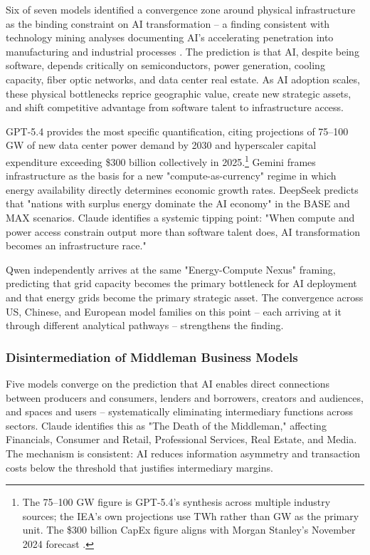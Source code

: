 \documentclass[preprint,review,12pt]{elsarticle}
\begin{document}
Six of seven models identified a convergence zone around physical infrastructure as the binding constraint on AI transformation -- a finding consistent with technology mining analyses documenting AI's accelerating penetration into manufacturing and industrial processes \citep{zeba2021aimanufacturing}. The prediction is that AI, despite being software, depends critically on semiconductors, power generation, cooling capacity, fiber optic networks, and data center real estate. As AI adoption scales, these physical bottlenecks reprice geographic value, create new strategic assets, and shift competitive advantage from software talent to infrastructure access.

GPT-5.4 provides the most specific quantification, citing projections of 75--100 GW of new data center power demand by 2030 and hyperscaler capital expenditure exceeding \$300 billion collectively in 2025.\footnote{The 75--100 GW figure is GPT-5.4's synthesis across multiple industry sources; the IEA's own projections use TWh rather than GW as the primary unit. The \$300 billion CapEx figure aligns with Morgan Stanley's November 2024 forecast \citep{morganstanley2024capex}.} Gemini frames infrastructure as the basis for a new "compute-as-currency" regime in which energy availability directly determines economic growth rates. DeepSeek predicts that "nations with surplus energy dominate the AI economy" in the BASE and MAX scenarios. Claude identifies a systemic tipping point: "When compute and power access constrain output more than software talent does, AI transformation becomes an infrastructure race."

Qwen independently arrives at the same "Energy-Compute Nexus" framing, predicting that grid capacity becomes the primary bottleneck for AI deployment and that energy grids become the primary strategic asset. The convergence across US, Chinese, and European model families on this point -- each arriving at it through different analytical pathways -- strengthens the finding.


\subsubsection{Disintermediation of Middleman Business Models}
\label{sec:disintermediation}

Five models converge on the prediction that AI enables direct connections between producers and consumers, lenders and borrowers, creators and audiences, and spaces and users -- systematically eliminating intermediary functions across sectors. Claude identifies this as "The Death of the Middleman," affecting Financials, Consumer and Retail, Professional Services, Real Estate, and Media. The mechanism is consistent: AI reduces information asymmetry and transaction costs below the threshold that justifies intermediary margins.
\end{document}
